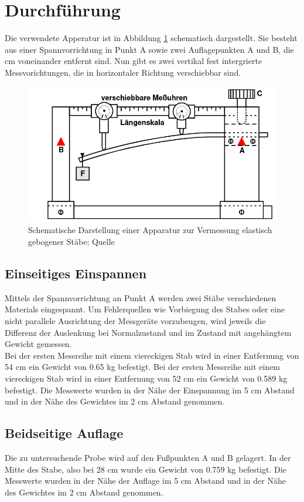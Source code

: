 \section{Durchführung}
\label{sec:Durchführung}

Die verwendete Apperatur ist in Abbildung \ref{fig:backfisch} schematisch dargestellt. Sie besteht aus 
einer Spannvorrichtung in Punkt A sowie zwei Auflagepunkten A und B, die %
cm voneinander entfernt sind.
Nun gibt es zwei vertikal fest intergrierte Messvorichtungen, die in horizontaler Richtung 
verschiebbar sind.
\begin{figure}
    \centering
    \includegraphics[scale=0.5]{panierte Austern.png}
    \caption{Schematische Darstellung einer Apparatur zur Vermessung elastisch gebogener Stäbe; Quelle \cite{sample}}
    \label{fig:backfisch}
\end{figure}

\subsection{Einseitiges Einspannen}
    Mittels der Spannvorrichtung an Punkt A werden zwei Stäbe verschiedenen Materials
    eingespannt. Um Fehlerquellen wie Vorbiegung des Stabes oder eine nicht parallele
    Ausrichtung der Messgeräte vorzubeugen, wird jeweils die Differenz der Auslenkung
    bei Normalzustand und im Zustand mit angehängtem Gewicht gemessen.\\
    Bei der ersten Messreihe mit einem viereckigen Stab wird in einer Entfernung von 54
    cm ein Gewicht von 0.65 kg befestigt.
    Bei der ersten Messreihe mit einem viereckigen Stab wird in einer Entfernung von 52
    cm ein Gewicht von 0.589 kg befestigt.
    Die Messwerte wurden in der Nähe der Einspannung im 5 cm Abstand und in der Nähe
    des Gewichtes im 2 cm Abstand genommen.


\subsection{Beidseitige Auflage}
    Die zu untersuchende Probe wird auf den Fußpunkten A und B gelagert. In der Mitte
    des Stabe, also bei 28 cm wurde ein Gewicht von 0.759 kg befestigt.
    Die Messwerte wurden in der Nähe der Auflage im 5 cm Abstand und in der Nähe
    des Gewichtes im 2 cm Abstand genommen.